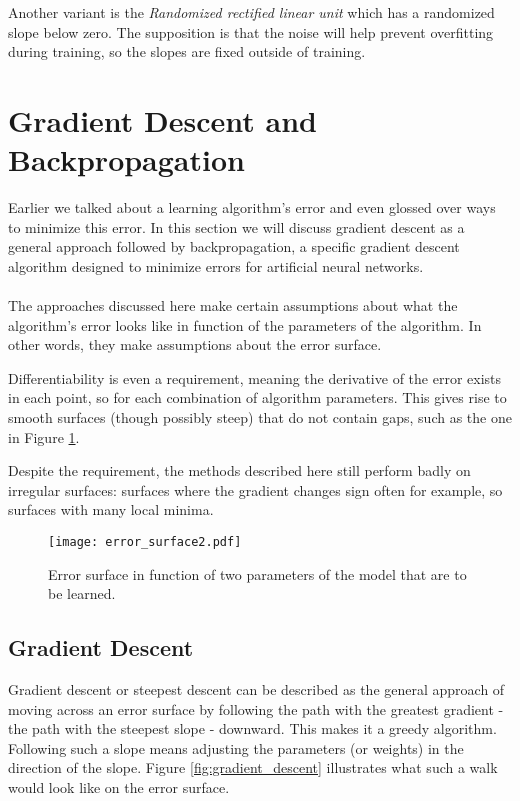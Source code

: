 Another variant is the
\textit{Randomized rectified linear unit}
which has a randomized slope below zero.
The supposition is that the noise
will help prevent overfitting during training,
so the slopes are fixed outside of training.


\section{Gradient Descent and Backpropagation}
\label{sec.backprop}
Earlier we talked about a learning algorithm's error
and even glossed over ways to minimize this error.
In this section we will discuss gradient descent
as a general approach
followed by backpropagation,
a specific gradient descent algorithm
designed to minimize errors
for artificial neural networks.

\paragraph{}
The approaches discussed here
make certain assumptions about
what the algorithm's error looks like
in function of the parameters of the algorithm.
In other words, they make assumptions
about the error surface.

Differentiability is even a requirement, %
meaning the derivative of the error
exists in each point,
so for each combination of algorithm parameters.
This gives rise to smooth surfaces
(though possibly steep)
that do not contain gaps,
such as the one in
Figure \ref{fig:error_surface}.

Despite the requirement,
the methods described here still perform badly
on irregular surfaces:
surfaces where the gradient changes sign often for example,
so surfaces with many local minima.

\begin{figure}[ht]
  \centering
  \texttt{[image: error\_surface2.pdf]}
  \caption{Error surface in function of two parameters of the model
  that are to be learned.}
  \label{fig:error_surface}
\end{figure}

\subsection{Gradient Descent}
\label{sub:gradient_descent}

Gradient descent or steepest descent
can be described as the general approach
of moving across an error surface
by following the path with the greatest gradient
- the path with the steepest slope -
downward.
This makes it a greedy algorithm.
Following such a slope
means adjusting the parameters (or weights)
in the direction of the slope.
Figure \ref{fig:gradient_descent}
illustrates what such a walk
would look like on the error surface.

